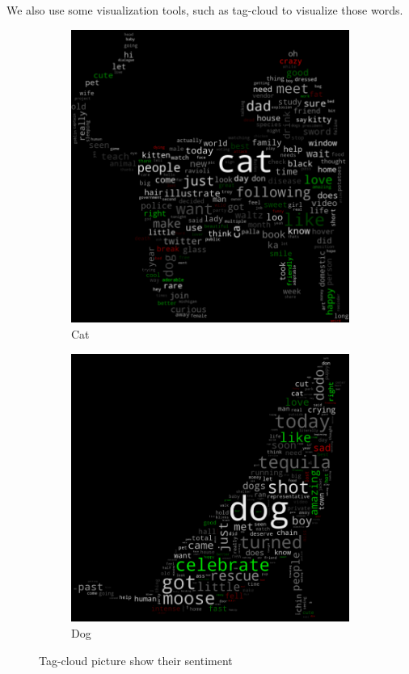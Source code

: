 \documentclass[12pt]{article}
\begin{document}
We also use some visualization tools, such as tag-cloud to visualize those words.

\begin{figure}[h!]
  \centering
  \begin{subfigure}[b]{0.4\linewidth}
    \includegraphics[width=\linewidth]{../Sentiment/tag_cat.png}
    \caption{Cat}
  \end{subfigure}
  \begin{subfigure}[b]{0.437\linewidth}
    \includegraphics[width=\linewidth]{../Sentiment/tag_dog.png}
    \caption{Dog}
  \end{subfigure}
  \caption{Tag-cloud picture show their sentiment}
  \label{fig:tagcloud}
\end{figure}
\end{document}
